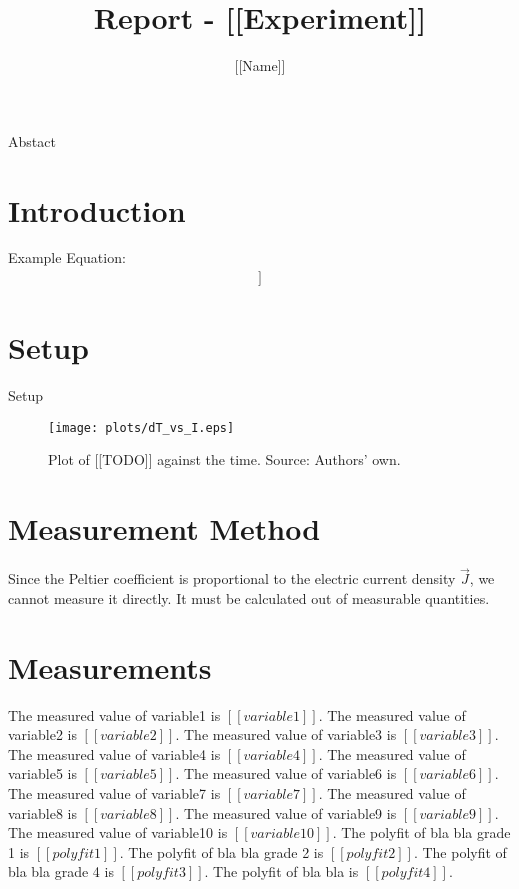 \documentclass[a4paper]{article}
\author{[[Name]]}
\title{Report - [[Experiment]]}
\begin{document}
\maketitle
\abstract 
Abstact
\section{Introduction}
Example Equation:
\begin{align}
[[EQ1]]
\label{eq:Example Equation}
\end{align}
\section{Setup}
Setup

\begin{figure}[H]
\centering
\texttt{[image: plots/dT\_vs\_I.eps]}
\caption{Plot of [[TODO]] against the time. Source: Authors' own.}
\label{fig:text}
\end{figure}

\section{Measurement Method}

Since the Peltier coefficient is proportional to the electric current density $\vec{J}$, we cannot measure it directly. It must be calculated out of measurable quantities.

\section{Measurements}
The measured value of variable1 is $[[variable1]]$.
\newline
The measured value of variable2 is $[[variable2]]$.
\newline
The measured value of variable3 is $[[variable3]]$.
\newline
The measured value of variable4 is $[[variable4]]$.
\newline
The measured value of variable5 is $[[variable5]]$.
\newline
The measured value of variable6 is $[[variable6]]$.
\newline
The measured value of variable7 is $[[variable7]]$.
\newline
The measured value of variable8 is $[[variable8]]$.
\newline
The measured value of variable9 is $[[variable9]]$.
\newline
The measured value of variable10 is $[[variable10]]$.
\newline
The polyfit of bla bla grade 1 is $[[polyfit1]]$.
\newline
The polyfit of bla bla grade 2 is $[[polyfit2]]$.
\newline
The polyfit of bla bla grade 4 is $[[polyfit3]]$.
\newline
The polyfit of bla bla is $[[polyfit4]]$.
\newline
\end{document}

